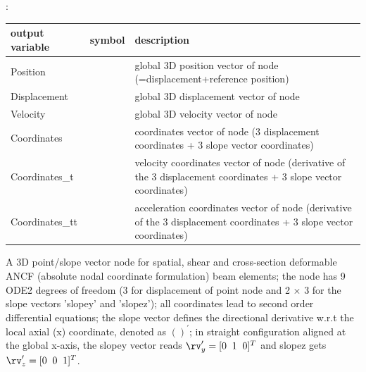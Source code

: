 :
\begin{center}
\footnotesize
\begin{longtable}{| p{5cm} | p{5cm} | p{6cm} |} 
\hline
\bf output variable & \bf symbol & \bf description \\ \hline
Position &  & global 3D position vector of node (=displacement+reference position)\\ \hline
Displacement &  & global 3D displacement vector of node\\ \hline
Velocity &  & global 3D velocity vector of node\\ \hline
Coordinates &  & coordinates vector of node (3 displacement coordinates + 3 slope vector coordinates)\\ \hline
Coordinates\_t &  & velocity coordinates vector of node (derivative of the 3 displacement coordinates + 3 slope vector coordinates)\\ \hline
Coordinates\_tt &  & acceleration coordinates vector of node (derivative of the 3 displacement coordinates + 3 slope vector coordinates)\\ \hline
\end{longtable}
\end{center}
\newpage


\label{sec:item:NodePoint3DSlope23}
A 3D point/slope vector node for spatial, shear and cross-section deformable ANCF (absolute nodal coordinate formulation) beam elements; the node has 9 ODE2 degrees of freedom (3 for displacement of point node and 2 $\times$ 3 for the slope vectors 'slopey' and 'slopez'); all coordinates lead to second order differential equations; the slope vector defines the directional derivative w.r.t the local axial (x) coordinate, denoted as $()^\prime$; in straight configuration aligned at the global x-axis, the slopey vector reads $\rv_y^\prime=[0\;\;1\;\;0]^T$ and slopez gets $\rv_z^\prime=[0\;\;0\;\;1]^T$.
\vspace{12pt}\\

